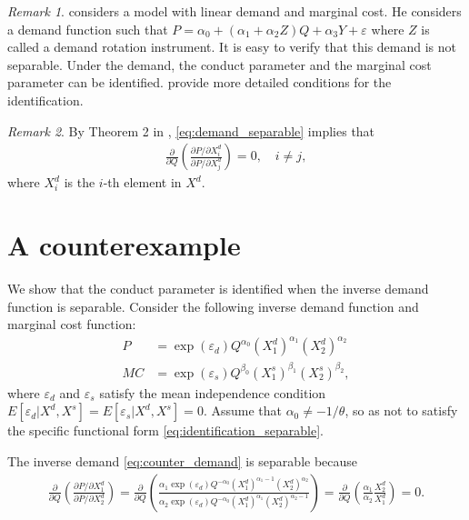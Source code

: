 \documentclass[11pt, a4paper]{article}
\theoremstyle{remark}
\newtheorem{remark}{Remark}
\begin{document}
\begin{remark}
    \citet{bresnahan1982oligopoly} considers a model with linear demand and marginal cost.
    He considers a demand function such that $P = \alpha_0 + (\alpha_1 + \alpha_2 Z) Q + \alpha_3 Y + \varepsilon$ where $Z$ is called a demand rotation instrument.
    It is easy to verify that this demand is not separable.
    Under the demand, the conduct parameter and the marginal cost parameter can be identified.
    \citet{matsumura2023resolving} provide more detailed conditions for the identification.
\end{remark}

\begin{remark}
    By Theorem 2 in \citet{goldmanNote1964}, \eqref{eq:demand_separable} implies that 
    \begin{align}
    \frac{\partial }{\partial Q} \left(\frac{\partial P/\partial X_{i}^{d}}{\partial P/\partial X_{j}^{d}} \right) = 0,\quad i \ne j, 
\end{align}
where $X_{i}^{d}$ is the $i$-th element in $X^{d}$.
\end{remark}

\section{A counterexample}

We show that the conduct parameter is identified when the inverse demand function is separable. 
Consider the following inverse demand function and marginal cost function:
\begin{align}
    P & = \exp(\varepsilon_{d}) Q^{\alpha_0} (X_{1}^{d})^{\alpha_1}(X_{2}^{d})^{\alpha_2}\label{eq:counter_demand}\\
    MC & = \exp(\varepsilon_{s})Q^{\beta_0} (X_{1}^{s})^{\beta_1} (X_{2}^{s})^{\beta_2},\label{eq:counter_mc}
\end{align}
where $\varepsilon_{d}$ and $\varepsilon_{s}$ satisfy the mean independence condition $E[\varepsilon_{d}|X^{d}, X^{s}] = E[\varepsilon_{s}|X^{d}, X^{s}] =0$. 
Assume that $\alpha_0 \ne -1/\theta$, so as not to satisfy the specific functional form \eqref{eq:identification_separable}.

The inverse demand \eqref{eq:counter_demand} is separable because
\begin{align}
    \frac{\partial }{\partial Q} \left(\frac{\partial P/\partial X_{1}^{d}}{\partial P/\partial X_{2}^{d}} \right) = \frac{\partial }{\partial Q} \left(\frac{\alpha_{1}\exp(\varepsilon_{d}) Q^{-\alpha_0} (X_{1}^{d})^{\alpha_1-1}(X_{2}^{d})^{\alpha_2}}{\alpha_2\exp(\varepsilon_{d}) Q^{-\alpha_0} (X_{1}^{d})^{\alpha_1}(X_{2}^{d})^{\alpha_2-1}} \right) =  \frac{\partial }{\partial Q}\left(\frac{\alpha_1}{\alpha_2} \frac{X_{2}^{d}}{X_{1}^{d}} \right)=0.
\end{align}
\end{document}
